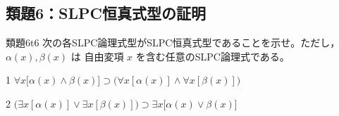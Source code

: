 \documentclass[autodetect-engine,dvi=dvipdfmx,ja=standard]{bxjsarticle}
\begin{document}
\subsection*{類題6：SLPC恒真式型の証明}

\begin{exercise}{類題6}{t6}
次の各SLPC論理式型がSLPC恒真式型であることを示せ。ただし，\(\alpha(x),\beta(x)\) は
自由変項 \(x\) を含む任意のSLPC論理式である。
\begin{pstep}{1}
  \(\forall x\bigl[\alpha(x)\land\beta(x)\bigr]\supset\bigl(\forall x[\alpha(x)]\land\forall x[\beta(x)]\bigr)\)
\end{pstep}
\begin{pstep}{2}
  \(\bigl(\exists x[\alpha(x)]\lor\exists x[\beta(x)]\bigr)\supset\exists x\bigl[\alpha(x)\lor\beta(x)\bigr]\)
\end{pstep}
\end{exercise}
\end{document}
